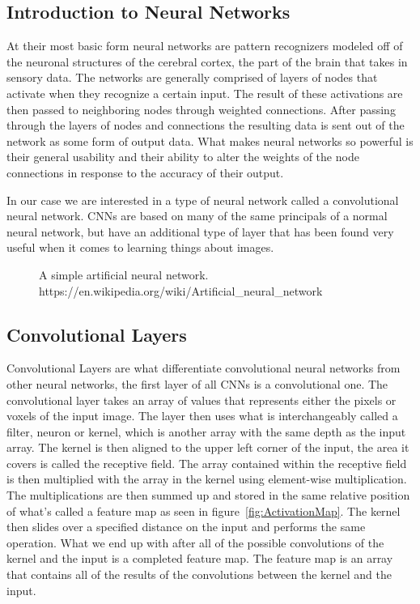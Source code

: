 \documentclass{sig-alternate}
\begin{document}
\subsection{Introduction to Neural Networks}
\label{sec:introNeuralNetworks}

At their most basic form neural networks are pattern recognizers modeled off of the neuronal structures of the cerebral cortex, the part of the brain that takes in sensory data. The networks are generally comprised of layers of nodes that activate when they recognize a certain input. The result of these activations are then passed to neighboring nodes through weighted connections. After passing through the layers of nodes and connections the resulting data is sent out of the network as some form of output data. What makes neural networks so powerful is their general usability and their ability to alter the weights of the node connections in response to the accuracy of their output.

In our case we are interested in a type of neural network called a convolutional neural network. CNNs are based on many of the same principals of a normal neural network, but have an additional type of layer that has been found very useful when it comes to learning things about images.

\begin{figure}
\centering
{}
\caption{A simple artificial neural network. https://en.wikipedia.org/wiki/Artificial\_neural\_network}
\label{fig:ANN}
\end{figure}

\subsection{Convolutional Layers}
\label{sec:convolutionalLayers}

Convolutional Layers are what differentiate convolutional neural networks from other neural networks, the first layer of all CNNs is a convolutional one. The convolutional layer takes an array of values that represents either the pixels or voxels of the input image. The layer then uses what is interchangeably called a filter, neuron or kernel, which is another array with the same depth as the input array. The kernel is then aligned to the upper left corner of the input, the area it covers is called the receptive field. The array contained within the receptive field is then multiplied with the array in the kernel using element-wise multiplication. The multiplications are then summed up and stored in the same relative position of what's called a feature map as seen in figure~\ref{fig:ActivationMap}. The kernel then slides over a specified distance on the input and performs the same operation. What we end up with after all of the possible convolutions of the kernel and the input is a completed feature map. The feature map is an array that contains all of the results of the convolutions between the kernel and the input.
\end{document}

